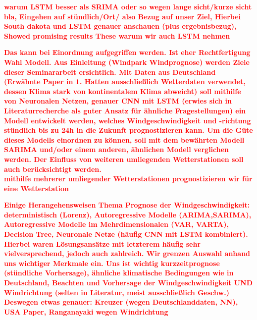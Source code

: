 \documentclass[
12pt, %
toc=listofnumbered, %
toc=chapterentrydotfill, %
numbers=noenddot, %
captions=tableheading, %
]{scrreprt}
\newcommand{\highlight}[1]{\textbf{\textcolor{red}{#1}}}
\begin{document}
\highlight{warum LSTM besser als SRIMA oder so wegen lange sicht/kurze sicht bla, Eingehen auf stündlich/Ort/ also Bezug auf 
unser Ziel, Hierbei South dakota und LSTM genauer anschauen (plus ergebnisbezug), Showed promising results These warum wir auch 
LSTM nehmen}

\highlight{ Das kann bei Einordnung aufgegriffen werden. Ist eher Rechtfertigung Wahl Modell.
	Aus Einleitung (Windpark Windprognose) werden Ziele dieser Seminararbeit ersichtlich. 
Mit Daten aus Deutschland (Erwähnte Paper in 1. Hatten ausschließlich Wetterdaten verwendet, dessen Klima stark von kontinentalem Klima abweicht) 
soll mithilfe von Neuronalen Netzen, genauer CNN mit LSTM (erwies sich in Literaturrecherche als guter Ansatz für ähnliche Fragestellungen) ein 
Modell entwickelt werden, welches Windgeschwindigkeit und -richtung stündlich bis zu 24h in die Zukunft prognostizieren kann. 
Um die Güte dieses Modells einordnen zu können, soll mit dem bewährten Modell SARIMA und/oder einem anderen, ähnlichen Modell verglichen werden. 
Der Einfluss von weiteren umliegenden Wetterstationen soll auch berücksichtigt werden.} \\

\highlight{mithilfe mehrerer umliegender Wetterstationen prognostizieren wir für eine Wetterstation}

\highlight{Einige Herangehensweisen Thema Prognose der Windgeschwindigkeit: 
deterministisch (Lorenz), Autoregressive Modelle (ARIMA,SARIMA), Autoregressive Modelle im Mehrdimensionalen (VAR, VARTA), 
Decision Tree,  Neuronale Netze (häufig CNN mit LSTM kombiniert). 
Hierbei waren Lösungsansätze mit letzterem häufig sehr vielversprechend, jedoch auch zahlreich.
Wir grenzen Auswahl anhand uns wichtiger Merkmale ein. 
Uns ist wichtig kurzzeitprognose (stündliche Vorhersage), ähnliche klimatische Bedingungen wie in Deutschland, Beachten und Vorhersage der Windgeschwindigkeit UND Windrichtung (selten in Literatur, meist ausschließlich Geschw.) 
Deswegen etwas genauer: Kreuzer (wegen Deutschlanddaten, NN), USA Paper, Ranganayaki wegen Windrichtung
}



\end{document}
